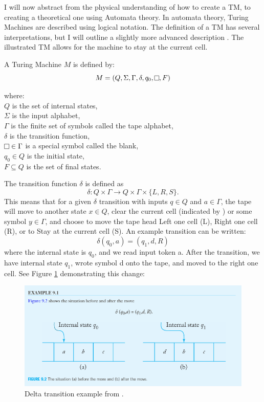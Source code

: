 I will now abstract from the physical understanding of how to create a TM, to creating a theoretical one using Automata theory.
In automata theory, Turing Machines are described using logical notation.
The definition of a TM has several interpretations, but I will outline a slightly more advanced description \cite{IntroFormLangAuto,TuBB}.
The illustrated TM allows for the machine to stay at the current cell.

\begin{definition}
    \label{def:TM}
    A Turing Machine $M$ is defined by:
        \[M = (Q, \Sigma ,\Gamma, \delta, q_{0}, \raisebox{0.1cm}{\fbox{}}, F)\]
        \par \hangindent=3cm 
        where: \\
        \( Q \) is the set of internal states,\\
        \( \Sigma \) is the input alphabet,\\
        \( \Gamma \) is the finite set of symbols called the tape alphabet,\\
        \( \delta \) is the transition function,\\
        \( \raisebox{0.1cm}{\fbox{}} \in \Gamma \) is a special symbol called the blank,\\
        \( q_{0} \in Q \) is the initial state,\\
        \( F \subseteq Q \) is the set of final states.
\end{definition}

The transition function $\delta$ is defined as \[\delta: Q \times \Gamma \rightarrow Q \times \Gamma \times \{L, R, S\}.\]
This means that for a given $\delta$ transition with inputs $q \in Q$ and $a \in \Gamma$, the tape will move to another state $x \in Q$, clear the current cell (indicated by \raisebox{0.1cm}{\fbox{}}) or some symbol $y \in \Gamma$, and choose to move the tape head Left one cell (L), Right one cell (R), or to Stay at the current cell (S).
An example transition can be written: \[\delta(q_{0}, a) = (q_{1}, d, R)\] where the internal state is $q_{0}$, and we read input token a.
After the transition, we have internal state $q_{1}$, wrote symbol d onto the tape, and moved to the right one cell.
See Figure \ref{fig:DeltaTransition} demonstrating this change:

\begin{figure}[htb]
    \centering
    \includegraphics[width=16cm]{Images/deltatransition.png}
       \caption{Delta transition example from \cite{IntroFormLangAuto}.}
           \label{fig:DeltaTransition}
\end{figure}

